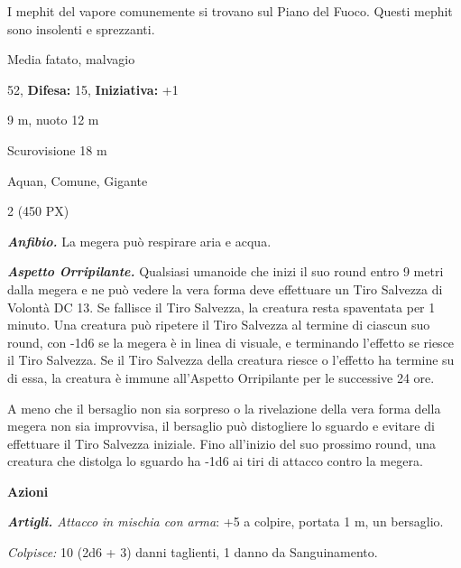 \begin{multicols}{2}
{I mephit del vapore comunemente si trovano sul Piano del Fuoco. Questi mephit sono insolenti e sprezzanti.

\noindent
\begin{description}[noitemsep, topsep=0pt, parsep=0pt, partopsep=0pt, leftmargin=0cm, labelwidth=2.2cm]
	\item[\textbf{Taglia/Tipo:}] Media fatato, malvagio
	\item[\textbf{Caratt.:}] 
	\item[\textbf{Punti Ferita:}] 52,  \textbf{Difesa:} 15,  \textbf{Iniziativa:} +1
	\item[\textbf{Movimento:}] 9 m, nuoto 12 m
	\item[\textbf{Tiri Salvez.:}] 
	\item[\textbf{Sensi:}] Scurovisione 18 m
	\item[\textbf{Linguaggi:}] Aquan, Comune, Gigante
	\item[\textbf{Sfida:}] 2 (450 PX)\smallskip
\end{description}

\emph{\textbf{Anfibio.}} La megera può respirare aria e acqua.

\emph{\textbf{Aspetto Orripilante.}} Qualsiasi umanoide che inizi il suo round entro 9 metri dalla megera e ne può vedere la vera forma deve effettuare un Tiro Salvezza di Volontà DC 13. Se fallisce il Tiro Salvezza, la creatura resta spaventata per 1 minuto. Una creatura può ripetere il Tiro Salvezza al termine di ciascun suo round, con -1d6 se la megera è in linea di visuale, e terminando l'effetto se riesce il Tiro Salvezza. Se il Tiro Salvezza della creatura riesce o l'effetto ha termine su di essa, la creatura è immune all'Aspetto Orripilante per le successive 24 ore.

A meno che il bersaglio non sia sorpreso o la rivelazione della vera forma della megera non sia improvvisa, il bersaglio può distogliere lo sguardo e evitare di effettuare il Tiro Salvezza iniziale. Fino all'inizio del suo prossimo round, una creatura che distolga lo sguardo ha -1d6 ai tiri di attacco contro la megera.

\textbf{Azioni}

\emph{\textbf{Artigli.} Attacco in mischia con arma}: +5 a colpire, portata 1 m, un bersaglio.

\emph{Colpisce:} 10 (2d6 + 3) danni taglienti, 1 danno da Sanguinamento.

}
\end{multicols}

